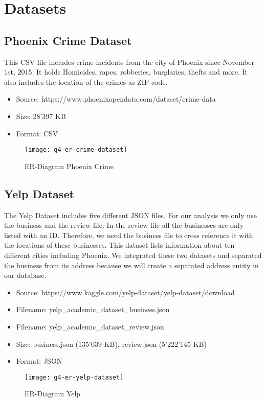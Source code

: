 \section{Datasets}

\subsection*{Phoenix Crime Dataset}
This CSV file includes crime incidents from the city of Phoenix since November 1st, 2015. It holds Homicides, rapes, robberies, burglaries, thefts and more. It also includes the location of the crimes as ZIP code.
\begin{itemize}
	\item Source: https://www.phoenixopendata.com/dataset/crime-data
	\item Size: 28'397 KB
	\item Format: CSV
\end{itemize}
\begin{figure}[H]
    \centering
    \texttt{[image: g4-er-crime-dataset]}
    \caption{ER-Diagram Phoenix Crime }
    \label{fig:phoenixCrime}
\end{figure}

\subsection*{Yelp Dataset}
The Yelp Dataset includes five different JSON files. For our analysis we only use the business and the review file. In the review file all the businesses are only listed with an ID. Therefore, we need the business file to cross reference it with the locations of these businesses. This dataset lists information about ten different cities including Phoenix.
We integrated these two datasets and separated the business from its address because we will create a separated address entity in our database.
\begin{itemize}
	\item Source: https://www.kaggle.com/yelp-dataset/yelp-dataset/download
	\item Filename: yelp\_academic\_dataset\_business.json
	\item Filename: yelp\_academic\_dataset\_review.json
	\item Size: business.json (135'039 KB), review.json (5'222'145 KB)
	\item Format: JSON
\end{itemize}
\begin{figure}[H]
    \centering
    \texttt{[image: g4-er-yelp-dataset]}
    \caption{ER-Diagram Yelp}
    \label{fig:yelpER}
\end{figure}

